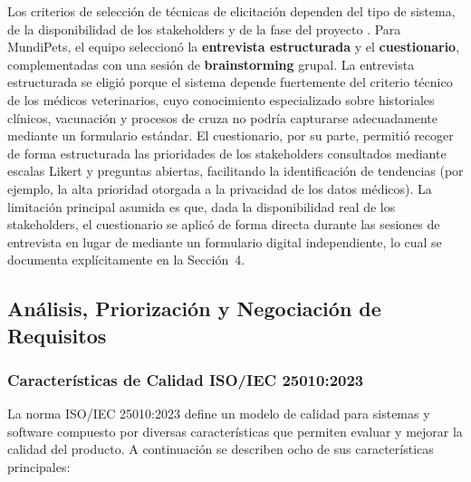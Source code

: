 \documentclass[journal,onecolumn]{IEEEtran}
\begin{document}
Los criterios de selección de técnicas de elicitación dependen del tipo de
sistema, de la disponibilidad de los stakeholders y de la fase del proyecto
\cite{ireb2023}. Para MundiPets, el equipo seleccionó la \textbf{entrevista
estructurada} y el \textbf{cuestionario}, complementadas con una sesión de
\textbf{brainstorming} grupal. La entrevista estructurada se eligió porque
el sistema depende fuertemente del criterio técnico de los médicos
veterinarios, cuyo conocimiento especializado sobre historiales clínicos,
vacunación y procesos de cruza no podría capturarse adecuadamente mediante
un formulario estándar. El cuestionario, por su parte, permitió recoger de
forma estructurada las prioridades de los stakeholders consultados mediante
escalas Likert y preguntas abiertas, facilitando la identificación de
tendencias (por ejemplo, la alta prioridad otorgada a la privacidad de los
datos médicos). La limitación principal asumida es que, dada la
disponibilidad real de los stakeholders, el cuestionario se aplicó de forma
directa durante las sesiones de entrevista en lugar de mediante un
formulario digital independiente, lo cual se documenta explícitamente en la
Sección~4.

\newpage

\subsection{Análisis, Priorización y Negociación de Requisitos}

\subsubsection{Características de Calidad ISO/IEC 25010:2023}

La norma ISO/IEC 25010:2023 \cite{iso25010} define un modelo de calidad
para sistemas y software compuesto por diversas características que
permiten evaluar y mejorar la calidad del producto. A continuación se
describen ocho de sus características principales:
\end{document}
